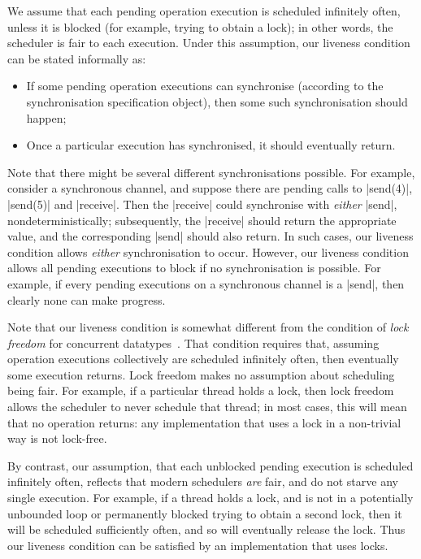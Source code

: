 We assume that each pending operation execution is scheduled infinitely often,
unless it is blocked (for example, trying to obtain a lock); in other words,
the scheduler is fair to each execution.  Under this assumption, our liveness
condition can be stated informally as:
%
\begin{itemize}
\item If some pending operation executions can synchronise (according to the
  synchronisation specification object), then some such synchronisation should
  happen;

\item Once a particular execution has synchronised, it should eventually
  return.
\end{itemize}
%
Note that there might be several different synchronisations possible.  For
example, consider a synchronous channel, and suppose there are pending calls
to |send(4)|, |send(5)| and |receive|.  Then the |receive| could synchronise
with \emph{either} |send|, nondeterministically; subsequently, the |receive|
should return the appropriate value, and the corresponding |send| should also
return.  In such cases, our liveness condition allows \emph{either}
synchronisation to occur.
%
However, our liveness condition allows all pending executions to block if no
synchronisation is possible.  For example, if every pending executions on a
synchronous channel is a |send|, then clearly none can make progress.

Note that our liveness condition is somewhat different from the condition of
\emph{lock freedom} for concurrent datatypes~\cite{herlihy-shavit}.  That
condition requires that, assuming operation executions collectively are
scheduled infinitely often, then eventually some execution returns.  Lock
freedom makes no assumption about scheduling being fair.  For example, if a
particular thread holds a lock, then lock freedom allows the scheduler to
never schedule that thread; in most cases, this will mean that no operation
returns: any implementation that uses a lock in a non-trivial way is not
lock-free.

By contrast, our assumption, that each unblocked pending execution is
scheduled infinitely often, reflects that modern schedulers \emph{are} fair,
and do not starve any single execution.  For example, if a thread holds
a lock,  and is not in a potentially unbounded loop or permanently blocked
trying to obtain a second lock, then it will be scheduled sufficiently often,
and so will eventually release the lock.  Thus our liveness condition can be
satisfied by an implementation that uses locks.  

